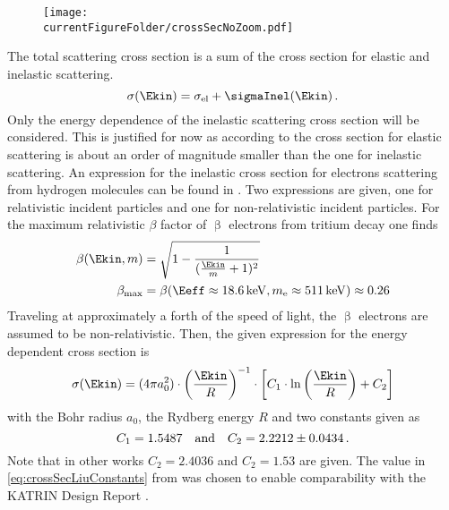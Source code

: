 \begin{figure}[t]
    \centering
    \texttt{[image: \\currentFigureFolder/crossSecNoZoom.pdf]}
    \label{fig:scatCrossSec}
\end{figure}
The total scattering cross section is a sum of the cross section for elastic and inelastic scattering.
\begin{equation}
    \sigma(\Ekin) = \sigma_\mathrm{el} + \sigmaInel(\Ekin)
    \fullstop
\end{equation}
Only the energy dependence of the inelastic scattering cross section will be considered. This is justified for now as according to \cite{Angrik:2005ep} the cross section for elastic scattering is about an order of magnitude smaller than the one for inelastic scattering. An expression for the inelastic cross section for electrons scattering from hydrogen molecules can be found in \cite{Liu1973}. Two expressions are given, one for relativistic incident particles and one for non-relativistic incident particles. For the maximum relativistic $\beta$ factor of $\upbeta$ electrons from tritium decay one finds
\begin{equation}
\begin{split}
    \beta(\Ekin, m) &= 
    \sqrt{
        1-\frac{1}{
            (\frac{\Ekin}{m}+1)^2
        }
    } \\
    \beta_\mathrm{max} &= 
    \beta(\Eeff\approx\SI{18.6}{keV}, m_\elecIndex\approx\SI{511}{keV})\approx0.26
\end{split}
\end{equation}
Traveling at approximately a forth of the speed of light, the $\upbeta$ electrons are assumed to be non-relativistic. Then, the given expression for the energy dependent cross section is
\begin{equation}
	\label{eq:crossSecLiu}
    \sigma(\Ekin) =  
    (4 \pi a_0^2) \cdot
    \left(\frac{\Ekin}{R}\right)^{-1} \cdot
     \left[
        C_1 \cdot \ln{\left(\frac{\Ekin}{R}\right)} + C_2
    \right]
\end{equation}
with the Bohr radius $a_0$, the Rydberg energy $R$ and two constants given as
\begin{equation}
	\label{eq:crossSecLiuConstants}
    C_1 = 1.5487 
    \quad \text{and} \quad 
    C_2 = 2.2212\pm0.0434
    \text{\,.}
\end{equation}
Note that in other works $C_2=2.4036$ \cite{Liu1987} and $C_2=1.53$ \cite{Gerhart1975} are given. The value in \eqref{eq:crossSecLiuConstants} from \cite{Liu1973} was chosen to enable comparability with the KATRIN Design Report \cite{Angrik:2005ep}.

